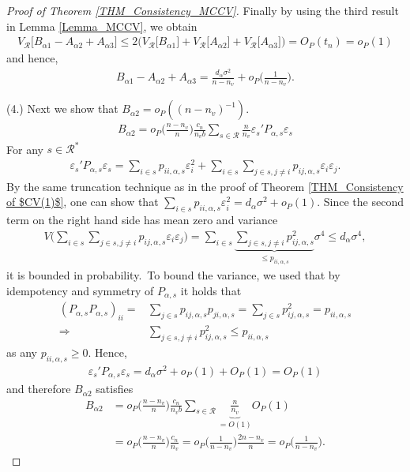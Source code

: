 \documentclass[Research_Module_ES.tex]{subfiles}
\begin{document}
\begin{proof}[Proof of Theorem \ref{THM_Consistency_MCCV}]
	Finally by using the third result in Lemma \ref{Lemma_MCCV}, we obtain
	\begin{align*}
	V_\mathcal{R}\bigl[B_{\alpha1}-A_{\alpha2}+A_{\alpha3}\bigr] \le 2\bigl(V_\mathcal{R}\bigl[B_{\alpha1}\bigr]+V_\mathcal{R}\bigl[A_{\alpha2}\bigr]+V_\mathcal{R}\bigl[A_{\alpha3}\bigr]\bigr) = O_P(t_n)=o_P(1)
	\end{align*}
	and hence,
	\begin{align*}
	B_{\alpha1}-A_{\alpha2}+A_{\alpha3} = \frac{d_\alpha\sigma^2 }{n-n_v}+ o_P\biggl(\frac{1}{n-n_v}\biggr).
	\end{align*}
	
	(4.) Next we show that $B_{\alpha2} = o_P((n-n_v)^{-1})$.
	\begin{align*}
	B_{\alpha2} = o_P\biggl(\frac{n-n_v}{n}\biggr)\frac{c_n}{n_vb}\sum_{s\in\mathcal{R}}\frac{n}{n_v}\varepsilon_s'P_{\alpha,s}\varepsilon_s
	\end{align*}
	For any $s\in \mathcal{R}^\ast$
	\begin{align*}
	\varepsilon_s'P_{\alpha,s}\varepsilon_s = \sum_{i\in s} p_{ii,\alpha,s} \varepsilon_i^2 + \sum_{i \in s}\sum_{j\in s, j\neq i}  p_{ij,\alpha,s} \varepsilon_i\varepsilon_j.
	\end{align*}
	By the same truncation technique as in the proof of Theorem \ref{THM_Consistency of $CV(1)$}, one can show that $\sum_{i\in s} p_{ii,\alpha,s} \varepsilon_i^2 = d_\alpha\sigma^2 + o_P(1)$. Since the second term on the right hand side has mean zero and variance
	\begin{align*}
	V\biggl( \sum_{i \in s}\sum_{j\in s, j\neq i}  p_{ij,\alpha,s} \varepsilon_i\varepsilon_j\biggr) =  \sum_{i \in s}
	\underbrace{\sum_{j\in s, j\neq i}  p_{ij,\alpha,s}^2}_{\le p_{ii,\alpha,s}} \sigma^4 \le d_\alpha \sigma^4,
	\end{align*}
	it is bounded in probability.\
	To bound the variance, we used that by idempotency and symmetry of $P_{\alpha,s}$ it holds that
	\begin{align*}
	(P_{\alpha,s}P_{\alpha,s})_{ii} = &\sum_{j \in s} p_{ij,\alpha,s} p_{ji,\alpha,s} = \sum_{j \in s} p_{ij,\alpha,s}^2 = p_{ii,\alpha,s} \\
	\Rightarrow &\sum_{j \in s, j\neq i}p_{ij,\alpha,s}^2 \le p_{ii,\alpha,s}
	\end{align*}
	as any $p_{ii,\alpha,s} \ge 0$. Hence, 
	\begin{align*}
	\varepsilon_s'P_{\alpha,s}\varepsilon_s = d_\alpha\sigma^2 + o_P(1) + O_P(1) = O_P(1)
	\end{align*}
	and therefore $B_{\alpha2}$ satisfies
	\begin{align*}
	B_{\alpha2} &= o_P\biggl(\frac{n-n_v}{n}\biggr)\frac{c_n}{n_vb}\sum_{s\in\mathcal{R}}\underbrace{\frac{n}{n_v}}_{=O(1)}O_P(1)\\
	&= o_P\biggl(\frac{n-n_v}{n}\biggr)\frac{c_n}{n_v} = o_P\biggl(\frac{1}{n-n_v}\biggr)\frac{2n-n_v}{n} = o_P\biggl(\frac{1}{n-n_v}\biggr).
	\end{align*}
	

\end{proof}
\end{document}
